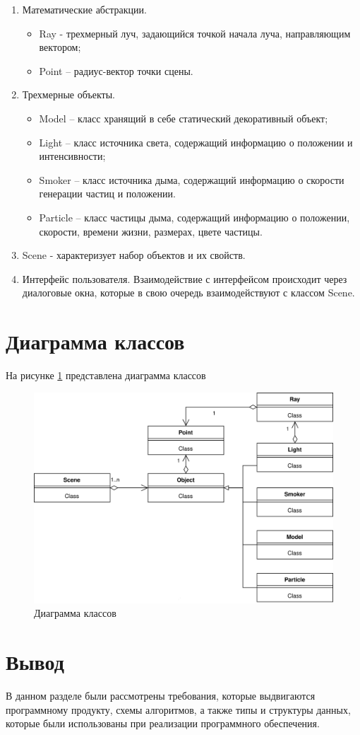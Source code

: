 \begin{enumerate}
	\item Математические абстракции.
	\begin{itemize}[label=---]
		\item Ray - трехмерный луч, задающийся точкой начала луча, направляющим вектором;
		\item Point – радиус-вектор точки сцены.
	\end{itemize}
	\item Трехмерные объекты.
	\begin{itemize}[label=---]
		\item Model – класс хранящий в себе статический декоративный объект;
		\item Light – класс источника света, содержащий информацию о положении и интенсивности;
		\item Smoker – класс источника дыма, содержащий информацию о скорости генерации частиц и положении.
		\item Particle – класс частицы дыма, содержащий информацию о положении, скорости, времени жизни, размерах, цвете частицы.
	\end{itemize}
	\item Scene - характеризует набор объектов и их свойств.
	\item Интерфейс пользователя. Взаимодействие с интерфейсом происходит через диалоговые окна, которые в свою очередь взаимодействуют с классом Scene.
\end{enumerate}
\newpage
\section{Диаграмма классов}
На рисунке \ref{fig:classdiagramm} представлена диаграмма классов
\begin{figure}[H]
	\centering
	\includegraphics[width=1\linewidth]{inc/img/ClassDiagramm}
	\caption{Диаграмма классов}
	\label{fig:classdiagramm}
\end{figure}

\section*{Вывод}

В данном разделе были рассмотрены требования, которые выдвигаются программному продукту, схемы алгоритмов, а также типы и структуры данных, которые были использованы при реализации программного обеспечения.





